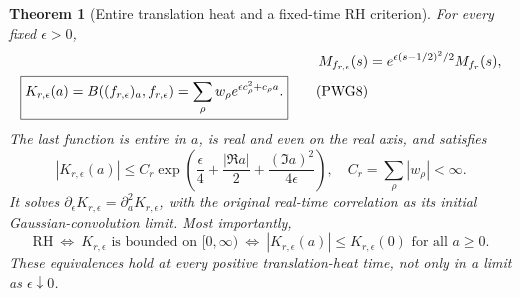 \documentclass[11pt,a4paper]{article}
\newtheorem{theorem}{Theorem}[section]
\theoremstyle{definition}\newtheorem{definition}[theorem]{Definition}
\begin{document}
\begin{theorem}[Entire translation heat and a fixed-time RH criterion]
For every fixed $\epsilon>0$,
\begin{align}
 M_{f_{r,\epsilon}}(s)&=e^{\epsilon(s-1/2)^2/2}M_{f_r}(s),\notag\\
 \boxed{K_{r,\epsilon}(a)=
 B((f_{r,\epsilon})_a,f_{r,\epsilon})
 =\sum_\rho w_\rho e^{\epsilon c_\rho^2+c_\rho a}.}          \tag{PWG8}\label{PWG8}
\end{align}
The last function is entire in $a$, is real and even on the real axis, and satisfies
\begin{equation}
 |K_{r,\epsilon}(a)|\le C_r
 \exp\left(\frac\epsilon4+\frac{|\Re a|}{2}
                         +\frac{(\Im a)^2}{4\epsilon}\right),
 \quad C_r=\sum_\rho|w_\rho|<\infty.                        \tag{PWG9}\label{PWG9}
\end{equation}
It solves $\partial_\epsilon K_{r,\epsilon}=\partial_a^2K_{r,\epsilon}$, with the original real-time correlation as its initial Gaussian-convolution limit. Most importantly,
\begin{equation}
 \boxed{\mathrm{RH}\ \Longleftrightarrow\
 K_{r,\epsilon}\text{ is bounded on }[0,\infty)
 \ \Longleftrightarrow\ |K_{r,\epsilon}(a)|\le K_{r,\epsilon}(0)
                    \text{ for all }a\ge0.}                \tag{PWG10}\label{PWG10}
\end{equation}
These equivalences hold at every positive translation-heat time, not only in a limit as $\epsilon\downarrow0$.
\end{theorem}
\end{document}
